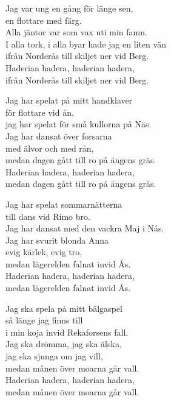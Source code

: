 \vspace{10pt}
Jag var ung en gång för länge sen,\\
en flottare med färg.\\
Alla jäntor var som vax uti min famn.\\
I alla tork, i alla byar hade jag en liten vän\\
ifrån Norderås till skiljet ner vid Berg.\\
Haderian hadera, haderian hadera,\\
ifrån Norderås till skiljet ner vid Berg.\par
\vspace{10pt}
Jag har spelat på mitt handklaver\\
för flottare vid ån,\\
jag har spelat för små kullorna på Näs.\\
Jag har dansat över forsarna\\
med älvor och med rån,\\
medan dagen gått till ro på ängens gräs.\\
Haderian hadera, haderian hadera,\\
medan dagen gått till ro på ängens gräs.\par
\vspace{10pt}
Jag har spelat sommarnätterna\\
till dans vid Rimo bro.\\
Jag har dansat med den vackra Maj i Nås.\\
Jag har svurit blonda Anna\\
evig kärlek, evig tro,\\
medan lägerelden falnat invid Ås.\\
Haderian hadera, haderian hadera,\\
medan lägerelden falnat invid Ås.\par
\vspace{10pt}
Jag ska spela på mitt bälgaspel\\
så länge jag finns till\\
i min koja invid Rekaforsens fall.\\
Jag ska drömma, jag ska älska,\\
jag ska sjunga om jag vill,\\
medan månen över moarna går vall.\\
Haderian hadera, haderian hadera,\\
medan månen över moarna går vall.
